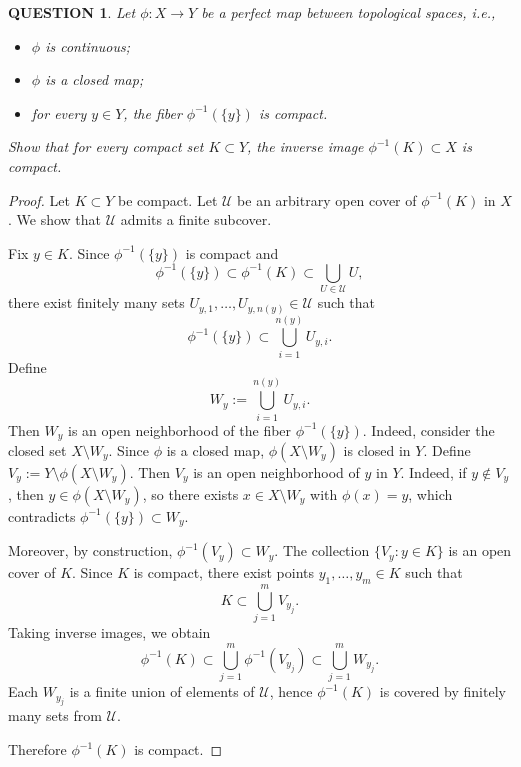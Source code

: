 \documentclass[12pt]{article}
\renewcommand{\(}{\left(}%
\renewcommand{\)}{\right)}%
\renewcommand{\[}{\left[}%
\renewcommand{\]}{\right]}%
\newtheorem{question}{QUESTION}[section]}
\newtheorem{proof}{Proof.}}
\begin{document}
\begin{question}
Let $\phi : X \to Y$ be a \emph{perfect} map between topological spaces, i.e.,
\begin{itemize}
  \item $\phi$ is continuous;
  \item $\phi$ is a closed map;
  \item for every $y \in Y$, the fiber $\phi^{-1}(\{y\})$ is compact.
\end{itemize}
Show that for every compact set $K \subset Y$, the inverse image $\phi^{-1}(K) \subset X$ is compact.
\end{question}

\begin{proof}
Let $K \subset Y$ be compact. Let $\mathcal U$ be an arbitrary open cover of $\phi^{-1}(K)$ in $X$.
We show that $\mathcal U$ admits a finite subcover.

Fix $y \in K$. Since $\phi^{-1}(\{y\})$ is compact and
\begin{equation*}
	\phi^{-1}(\{y\}) \subset \phi^{-1}(K) \subset \bigcup_{U \in \mathcal U} U,
\end{equation*}
there exist finitely many sets $U_{y,1}, \dots, U_{y,n(y)} \in \mathcal U$ such that
\begin{equation*}
\phi^{-1}(\{y\}) \subset \bigcup_{i=1}^{n(y)} U_{y,i}.
\end{equation*}
Define
\begin{equation*}
W_y := \bigcup_{i=1}^{n(y)} U_{y,i}.
\end{equation*}
Then $W_y$ is an open neighborhood of the fiber $\phi^{-1}(\{y\})$. Indeed, consider the closed set $X \setminus W_y$. Since $\phi$ is a closed map, $\phi(X \setminus W_y)$ is closed in $Y$. Define $V_y := Y \setminus \phi(X \setminus W_y)$.
Then $V_y$ is an open neighborhood of $y$ in $Y$. Indeed, if $y \notin V_y$, then
$y \in \phi(X \setminus W_y)$, so there exists $x \in X \setminus W_y$ with $\phi(x) = y$,
which contradicts $\phi^{-1}(\{y\}) \subset W_y$.

Moreover, by construction, $\phi^{-1}(V_y) \subset W_y$. The collection $\{V_y : y \in K\}$ is an open cover of $K$. Since $K$ is compact,
there exist points $y_1, \dots, y_m \in K$ such that
\begin{equation*}
K \subset \bigcup_{j=1}^m V_{y_j}.
\end{equation*}
Taking inverse images, we obtain
\begin{equation*}
\phi^{-1}(K)
\subset \bigcup_{j=1}^m \phi^{-1}(V_{y_j})
\subset \bigcup_{j=1}^m W_{y_j}.
\end{equation*}
Each $W_{y_j}$ is a finite union of elements of $\mathcal U$, hence
$\phi^{-1}(K)$ is covered by finitely many sets from $\mathcal U$.

Therefore $\phi^{-1}(K)$ is compact.
\end{proof}
\end{document}
